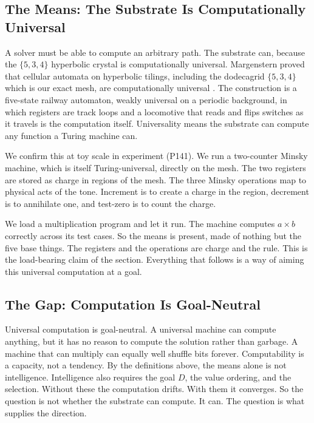 \subsection{The Means: The Substrate Is Computationally Universal}

A solver must be able to compute an arbitrary path. The substrate can, because the $\{5,3,4\}$ hyperbolic crystal is computationally universal. Margenstern proved that cellular automata on hyperbolic tilings, including the dodecagrid $\{5,3,4\}$ which is our exact mesh, are computationally universal \cite{margenstern2013}. The construction is a five-state railway automaton, weakly universal on a periodic background, in which registers are track loops and a locomotive that reads and flips switches as it travels is the computation itself. Universality means the substrate can compute any function a Turing machine can.

We confirm this at toy scale in experiment (P141). We run a two-counter Minsky machine, which is itself Turing-universal, directly on the mesh. The two registers are stored as charge in regions of the mesh. The three Minsky operations map to physical acts of the tone. Increment is to create a charge in the region, decrement is to annihilate one, and test-zero is to count the charge.

We load a multiplication program and let it run. The machine computes $a \times b$ correctly across its test cases. So the means is present, made of nothing but the five base things. The registers and the operations are charge and the rule. This is the load-bearing claim of the section. Everything that follows is a way of aiming this universal computation at a goal.

\subsection{The Gap: Computation Is Goal-Neutral}

Universal computation is goal-neutral. A universal machine can compute anything, but it has no reason to compute the solution rather than garbage. A machine that can multiply can equally well shuffle bits forever. Computability is a capacity, not a tendency. By the definitions above, the means alone is not intelligence. Intelligence also requires the goal $D$, the value ordering, and the selection. Without these the computation drifts. With them it converges. So the question is not whether the substrate can compute. It can. The question is what supplies the direction.

